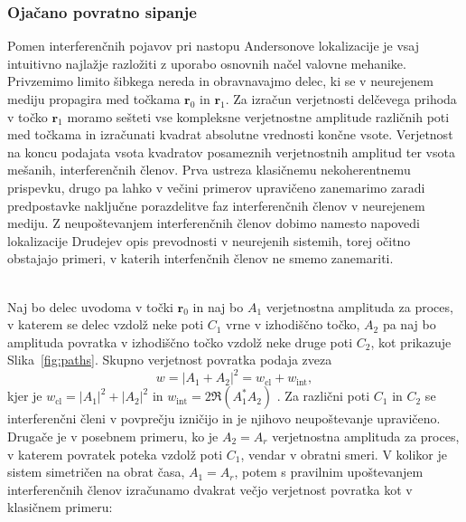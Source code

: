 \documentclass[10pt,a4paper]{article}
\begin{document}
 \subsubsection{Ojačano povratno sipanje}
 Pomen interferenčnih pojavov pri nastopu Andersonove lokalizacije je vsaj intuitivno najlažje razložiti z uporabo osnovnih načel valovne mehanike. Privzemimo limito šibkega nereda in obravnavajmo delec, ki se v neurejenem mediju propagira med točkama $\textbf{r}_0$ in $\textbf{r}_1$. Za izračun verjetnosti delčevega prihoda v točko $\textbf{r}_1$ moramo sešteti vse kompleksne verjetnostne amplitude različnih poti med točkama in izračunati kvadrat absolutne vrednosti končne vsote. Verjetnost na koncu podajata vsota kvadratov posameznih verjetnostnih amplitud ter vsota mešanih, interferenčnih členov. Prva ustreza klasičnemu nekoherentnemu prispevku, drugo pa lahko v večini primerov upravičeno zanemarimo zaradi predpostavke naključne porazdelitve faz interferenčnih členov v neurejenem mediju. Z neupoštevanjem interferenčnih členov dobimo namesto napovedi lokalizacije Drudejev opis prevodnosti v neurejenih sistemih, torej očitno obstajajo primeri, v katerih interfenčnih členov ne smemo zanemariti. \\\\
 \begin{minipage}[t]{0.58\textwidth}
\noindent  
Naj bo delec uvodoma v točki $\mathbf{r}_0$ in naj bo $A_1$ verjetnostna amplituda za proces, v katerem se delec vzdolž neke poti $C_1$ vrne v izhodiščno točko, $A_2$ pa naj bo amplituda povratka v izhodiščno točko vzdolž neke druge poti $C_2$, kot prikazuje Slika~\ref{fig:paths}.
Skupno verjetnost povratka podaja zveza 
\begin{equation}
w=|A_1 + A_2|^2=w_\mathrm{cl} + w_\mathrm{int},
\end{equation}
kjer je $w_\mathrm{cl}=|A_1|^2 + |A_2|^2$ in $w_\mathrm{int}=2\Re\left(A_1^*A_2\right)$ \cite{wolfle2010self}. Za različni poti $C_1$ in $C_2$ se interferenčni členi v povprečju izničijo in je njihovo neupoštevanje upravičeno. Drugače je v posebnem primeru, ko je  $A_2=A_r$ verjetnostna amplituda za proces, v katerem povratek poteka vzdolž poti $C_1$, vendar v obratni smeri. V kolikor je sistem simetričen na obrat časa, $A_1=A_r$, potem s pravilnim upoštevanjem interferenčnih  členov izračunamo dvakrat večjo verjetnost povratka kot v klasičnem primeru: 
\end{minipage}\hfill
\end{document}

